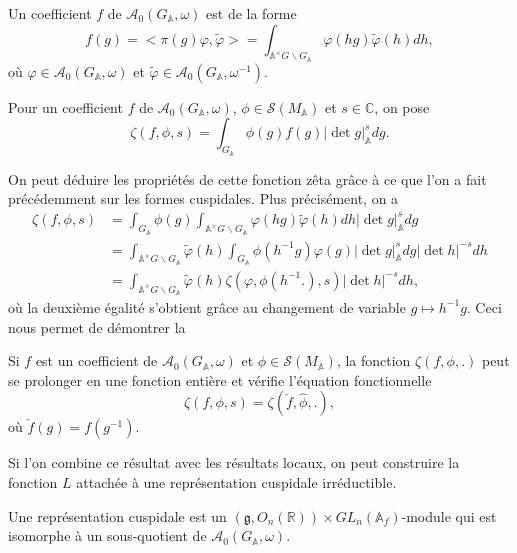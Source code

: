 Un coefficient $f$ de $\mathcal{A}_0(G_\mathbb{A}, \omega)$ est de la forme
\begin{equation}
f(g) = <\pi(g)\varphi, \tilde{\varphi}> = \int_{\mathbb{A}^\times G \backslash G_\mathbb{A}} \varphi(hg) \tilde{\varphi}(h) dh,
\end{equation}
où $\varphi \in \mathcal{A}_0(G_\mathbb{A}, \omega)$ et $\tilde{\varphi} \in \mathcal{A}_0(G_\mathbb{A}, \omega^{-1})$.

Pour un coefficient $f$ de $\mathcal{A}_0(G_\mathbb{A}, \omega)$, $\phi \in \mathcal{S}(M_\mathbb{A})$ et $s \in \mathbb{C}$, on pose
\begin{equation}
\zeta(f, \phi, s) = \int_{G_\mathbb{A}} \phi(g) f(g) |\det g|_\mathbb{A}^s dg.
\end{equation}

On peut déduire les propriétés de cette fonction zêta grâce à ce que l'on a fait précédemment sur les formes cuspidales. Plus précisément, on a
\begin{align}
\zeta(f, \phi, s) &= \int_{G_\mathbb{A}}\phi(g)\int_{\mathbb{A}^\times G \backslash G_\mathbb{A}} \varphi(hg) \tilde{\varphi}(h) dh |\det g|_\mathbb{A}^s dg \\
&= \int_{\mathbb{A}^\times G \backslash G_\mathbb{A}} \tilde{\varphi}(h) \int_{G_\mathbb{A}}\phi(h^{-1}g)\varphi(g)|\det g|_\mathbb{A}^s dg |\det h|^{-s} dh \\
&= \int_{\mathbb{A}^\times G \backslash G_\mathbb{A}} \tilde{\varphi}(h) \zeta(\varphi, \phi(h^{-1}.), s)|\det h|^{-s} dh,
\end{align}
où la deuxième égalité s'obtient grâce au changement de variable $g \mapsto h^{-1}g$. Ceci nous permet de démontrer la
\begin{proposition}
Si $f$ est un coefficient de $\mathcal{A}_0(G_\mathbb{A}, \omega)$ et $\phi \in \mathcal{S}(M_\mathbb{A})$, la fonction $\zeta(f, \phi, .)$ peut se prolonger en une fonction entière et vérifie l'équation fonctionnelle
\begin{equation}
\zeta(f, \phi, s) = \zeta(\check{f}, \hat{\phi}, .),
\end{equation}
où $\check{f}(g) = f(g^{-1})$.
\end{proposition}

Si l'on combine ce résultat avec les résultats locaux, on peut construire la fonction $L$ attachée à une représentation cuspidale irréductible.
\begin{definition}
Une représentation cuspidale est un $(\mathfrak{g}, O_n(\mathbb{R})) \times GL_n(\mathbb{A}_f)$-module qui est isomorphe à un sous-quotient de $\mathcal{A}_0(G_\mathbb{A}, \omega)$.
\end{definition}

